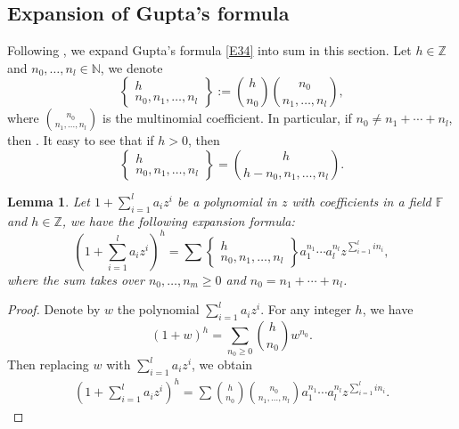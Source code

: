 \documentclass[10pt,a4paper]{amsart}
\newcommand{\Z}{\mathbb{Z}}
\newcommand{\N}{\mathbb{N}}
\numberwithin{equation}{section}
\newtheorem{Lemma}[Theorem]{Lemma}
\begin{document}
\subsection{Expansion of Gupta's formula}\label{S6}
Following \cite{LMN2023}, we expand Gupta's formula \eqref{E34} into sum in this section. Let $h\in \Z$ and $n_0,\dots, n_l\in \N$, we denote
\[\begin{Bmatrix}
 h\\
 n_0,n_1,\dots, n_l
\end{Bmatrix}:=\binom{h}{n_0}\binom{n_0}{n_1,\dots, n_l},
\]
where $\binom{n_0}{n_1,\dots, n_l}$ is the multinomial coefficient. In particular, if $n_0\neq n_1+\cdots +n_l$, then .
It easy to see that if $h>0$, then \[\begin{Bmatrix}
 h\\
 n_0,n_1,\dots, n_l
\end{Bmatrix}=\binom{h}{h-n_0,n_1,\dots, n_l}.\]
\begin{Lemma}\label{expansion of polynomial}
 Let $1+\sum_{i=1}^{l}a_iz^i$ be a polynomial in $z$ with coefficients in a field $\mathbb{F}$ and $h\in \Z$, we have the following expansion formula:
 \[
 \left(1+\sum\limits_{i=1}^{l}a_iz^i\right)^h=\sum\begin{Bmatrix}
 h\\
 n_0,n_1,\dots, n_l
\end{Bmatrix}a_1^{n_1}\cdots a_l^{n_l}z^{\sum\limits_{i=1}^{l} in_i},\]
where the sum takes over $n_0,\dots, n_m \geq 0$ and $n_0=n_1+\cdots+n_l$.
\end{Lemma}
\begin{proof}
 Denote by $w$ the polynomial $\sum_{i=1}^{l}a_iz^i$. For any integer $h$, we have \[(1+w)^{h}=\sum\limits_{n_0\ge 0}\binom{h}{n_0}w^{n_0}.\]
 Then replacing $w$ with $\sum_{i=1}^{l}a_iz^i$, we obtain
 \begin{align*}
 \left(1+\sum\limits_{i=1}^{l}a_iz^i\right)^h=\sum\binom{h}{n_0}\binom{n_0}{n_1,\dots,n_l}a_1^{n_1}\cdots a_l^{n_l}z^{\sum\limits_{i=1}^{l} in_i}.\tag*{\qed}
 \end{align*}\renewcommand{\qed}{}
\end{proof}
\end{document}
